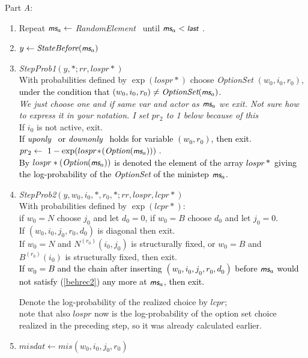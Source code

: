 \documentclass[a4paper,12pt,fleqn]{article}
\newcommand{\nnm}[1]{\textsf{\small\textit{#1}\ }}
\newcommand{\ms}{\textsl{\textsf{\small ms}}} %
\newcommand{\addcc}[1]{{\textcolor[named]{Black}{#1}}}
\newcommand{\addce}[1]{{\textcolor[named]{Black}{#1}}}
\begin{document}
Part \emph{A}:
\begin{enumerate}
\item Repeat $\ms_a \leftarrow $ \textit{RandomElement} \ until
       $\ms_a < \nnm{last}$.
\item $y \leftarrow  \textit{StateBefore}(\ms_a) $
\item \textit{StepProb1}$(y, *;  rr, lospr*)$ \\
       With probabilities defined by $\exp(lospr*)$ choose \textit{OptionSet} $(w_0,i_0,r_0)$,\\
       \addce{under the condition that  $(w_0,i_0,r_0) \neq
       \textit{OptionSet}(\ms_a)$.}\\
\emph{We just choose one and if same var and actor as $\ms_a$ we exit.
Not sure how to express it in your notation.
I set $pr_2$ to 1 below because of this}\\
      If $i_0$ is not active, exit.\\
      \addce{
      If \nnm{uponly} or \nnm{downonly} holds for variable $(w_0, r_0)$,
      then exit.\\
      $pr_2 \leftarrow \ 1 - \exp(lospr\! *\! (\textit{Option}(\ms_a))) \ . $\\
      By $lospr*(\textit{Option}(\ms_a))$ is denoted the element
      of the array $lospr*$ giving the log-probability
      of the \textit{OptionSet} of the ministep $\ms_a$.
      }
\item \textit{StepProb2}$( y, w_0,i_0,*,r_0,*;  rr, lospr, lcpr*)$ \\
      With probabilities defined by $\exp(lcpr*)$: \\
      if $w_0=N$ choose $j_0$ and let $d_0 = 0$,
      if $w_0=B$ choose $d_0$ and let $j_0=0$.\\
      If $(w_0,i_0,j_0,r_0,d_0)$ is diagonal then exit.\\
      If $w_0=N$ and $N^{(r_0)}(i_0,j_0)$ is structurally fixed,
      or $w_0=B$ and $B^{(r_0)}(i_0)$ is structurally fixed, then exit.\\
\addce{ If $w_0 = B$ and the chain after inserting $(w_0,i_0,j_0,r_0,d_0)$ before $\ms_a$
      would not satisfy (\ref{behrec2}) any more at $\ms_a$, then exit.}

      Denote the log-probability of the realized choice by $lcpr$;\\
      note that also $lospr$ now is the log-probability of the  option set choice
      realized in the preceding step, so it was already calculated earlier.
\item $\textit{misdat}  \leftarrow \textit{mis}(w_0,i_0,j_0,r_0)$


\end{enumerate}
\end{document}
